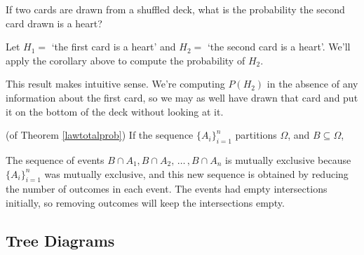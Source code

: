 \begin{examp}
If two cards are drawn from a shuffled deck, what is the probability the second card drawn is a heart?
\par
\noindent Let $H_1 =$ `the first card is a heart' and $H_2 =$ `the second card is a heart'. We'll apply the corollary above to compute the probability of $H_2$.
\par
\noindent This result makes intuitive sense. We're computing $P(H_2)$ in the absence of any information about the first card, so we may as well have drawn that card and put it on the bottom of the deck without looking at it.
\end{examp}
\begin{pf} (of Theorem \ref{lawtotalprob}) If the sequence $\{A_i\}_{i=1}^n$ partitions $\Omega$, and $B \subseteq \Omega$,
\par
\noindent The sequence of events $B \cap A_1, B \cap A_2, \, \dots \,, B \cap A_n$ is mutually exclusive because $\{A_i\}_{i=1}^{n}$ was mutually exclusive, and this new sequence is obtained by reducing the number of outcomes in each event. The events had empty intersections initially, so removing outcomes will keep the intersections empty.
\end{pf}

\subsection*{Tree Diagrams}

